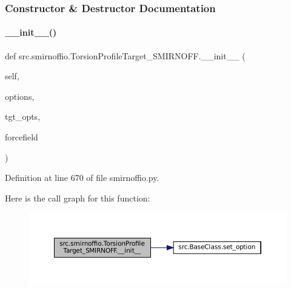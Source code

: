 \subsubsection{Constructor \& Destructor Documentation}
\mbox{\label{classsrc_1_1smirnoffio_1_1TorsionProfileTarget__SMIRNOFF_a2803ea982f051e7d2bceedf0b66c226e}} 
\paragraph{\texorpdfstring{\+\_\+\+\_\+init\+\_\+\+\_\+()}{\_\_init\_\_()}}
{\footnotesize\ttfamily def src.\+smirnoffio.\+Torsion\+Profile\+Target\+\_\+\+S\+M\+I\+R\+N\+O\+F\+F.\+\_\+\+\_\+init\+\_\+\+\_\+ (\begin{DoxyParamCaption}\item[{}]{self,  }\item[{}]{options,  }\item[{}]{tgt\+\_\+opts,  }\item[{}]{forcefield }\end{DoxyParamCaption})}



Definition at line 670 of file smirnoffio.\+py.

Here is the call graph for this function\+:
\nopagebreak
\begin{figure}[H]
\begin{center}
\leavevmode
\includegraphics[width=350pt]{classsrc_1_1smirnoffio_1_1TorsionProfileTarget__SMIRNOFF_a2803ea982f051e7d2bceedf0b66c226e_cgraph}
\end{center}
\end{figure}


